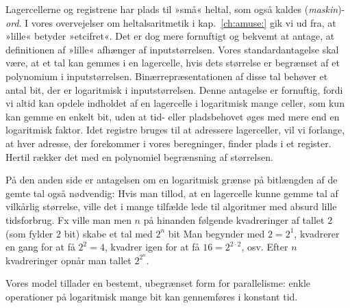 Lagercellerne og registrene
har plads til »små« heltal, som også kaldes (\emph{maskin})-\emph{ord}.
I vores overvejelser om heltalsaritmetik i kap.~\ref{ch:amuse:} gik vi ud fra, at »lille« betyder »etcifret«.
Det er dog mere fornuftigt og bekvemt at antage, at definitionen af »lille« afhænger af inputstørrelsen.
Vores standardantagelse skal være, at et tal kan gemmes i en lagercelle, hvis dets størrelse er begrænset af et polynomium i inputstørrelsen.
Binærrepræsentationen af disse tal behøver et antal bit, der er logaritmisk i inputstørrelsen.
Denne antagelse er fornuftig, fordi vi altid kan opdele indholdet af en lagercelle i logaritmisk mange celler, som kun kan gemme en enkelt bit, uden at tid- eller pladsbehovet øges med mere end en logaritmisk faktor.
Idet registre bruges til at adressere lagerceller, vil vi forlange, at hver adresse, der forekommer i vores beregninger, finder plads i et register.
Hertil rækker det med en polynomiel begrænsning af størrelsen.

På den anden side er antagelsen om en logaritmisk grænse på bitlængden af de gemte tal også nødvendig:
Hvis man tillod, at en lagercelle kunne gemme tal af vilkårlig størrelse, ville det i mange tilfælde lede til algoritmer med absurd lille tidsforbrug.
Fx ville man men $n$ på hinanden følgende kvadreringer af tallet $2$ (som fylder $2$ bit) skabe et tal med $2^n$ bit
Man begynder med $2=2^1$, kvadrerer en gang for at få $2^2=4$, kvadrer igen for at få $16=2^{2\cdot 2}$, osv. 
Efter $n$ kvadreringer opnår man tallet $2^{2^n}$.

Vores model tillader en bestemt, ubegrænset form  for parallelisme:
enkle operationer på logaritmisk mange bit kan gennemføres i konstant tid.

